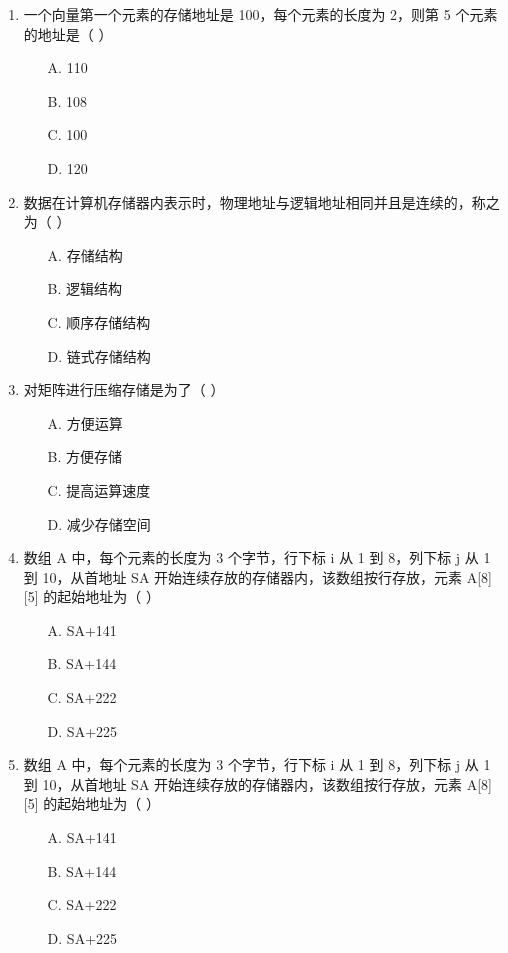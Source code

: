 \documentclass[12pt, a4paper]{article}
\begin{document}
\begin{enumerate}[label=\arabic*.]
	\item 一个向量第一个元素的存储地址是 100，每个元素的长度为 2，则第 5 个元素的地址是（ ）
	      \begin{enumerate}
		      \item[A.] 110
		      \item[B.] 108
		      \item[C.] 100
		      \item[D.] 120
	      \end{enumerate}

	\item 数据在计算机存储器内表示时，物理地址与逻辑地址相同并且是连续的，称之为（ ）
	      \begin{enumerate}
		      \item[A.] 存储结构
		      \item[B.] 逻辑结构
		      \item[C.] 顺序存储结构
		      \item[D.] 链式存储结构
	      \end{enumerate}

	\item 对矩阵进行压缩存储是为了（ ）
	      \begin{enumerate}
		      \item[A.] 方便运算
		      \item[B.] 方便存储
		      \item[C.] 提高运算速度
		      \item[D.] 减少存储空间
	      \end{enumerate}

	\item 数组 A 中，每个元素的长度为 3 个字节，行下标 i 从 1 到 8，列下标 j 从 1 到 10，从首地址 SA 开始连续存放的存储器内，该数组按行存放，元素 A[8][5] 的起始地址为（ ）
	      \begin{enumerate}
		      \item[A.] SA+141
		      \item[B.] SA+144
		      \item[C.] SA+222
		      \item[D.] SA+225
	      \end{enumerate}

	\item 数组 A 中，每个元素的长度为 3 个字节，行下标 i 从 1 到 8，列下标 j 从 1 到 10，从首地址 SA 开始连续存放的存储器内，该数组按行存放，元素 A[8][5] 的起始地址为（ ）
	      \begin{enumerate}
		      \item[A.] SA+141
		      \item[B.] SA+144
		      \item[C.] SA+222
		      \item[D.] SA+225
	      \end{enumerate}


\end{enumerate}
\end{document}

